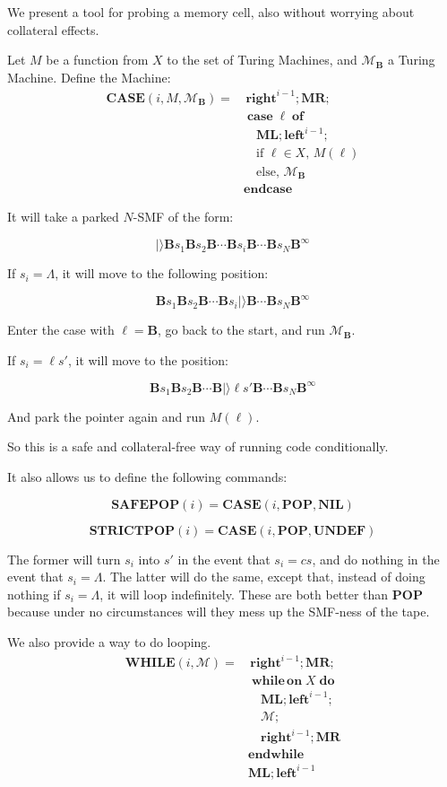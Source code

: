 \documentclass{article}
\newcommand{\B}{\mathbf{B}}
\newcommand{\M}{\mathcal{M}}
\DeclareMathOperator{\Nwhileon}{\mathbf{while\,on}}
\DeclareMathOperator{\Ndo}{\mathbf{do}}
\DeclareMathOperator{\Nendwhile}{\mathbf{endwhile}}
\DeclareMathOperator{\Ncase}{\mathbf{case}}
\DeclareMathOperator{\Nof}{\mathbf{of}}
\DeclareMathOperator{\Nendcase}{\mathbf{endcase}}
\newcommand{\NIL}{\mathbf{NIL}}
\newcommand{\MR}{\mathbf{MR}}
\newcommand{\ML}{\mathbf{ML}}
\newcommand{\UNDEF}{\mathbf{UNDEF}}
\newcommand{\Oright}{\mathbf{right}}
\newcommand{\Oleft}{\mathbf{left}}
\newcommand{\POP}{\mathbf{POP}}
\newcommand{\SAFEPOP}{\mathbf{SAFEPOP}}
\newcommand{\STRICTPOP}{\mathbf{STRICTPOP}}
\newcommand{\CASE}{\mathbf{CASE}}
\newcommand{\WHILE}{\mathbf{WHILE}}
\begin{document}
	We present a tool for probing a memory cell, also without worrying about collateral effects.
	
	Let $M$ be a function from $X$ to the set of Turing Machines, and $\M_\B$ a Turing Machine. Define the Machine:
	\begin{align*}
	\CASE(i, M, \M_\B) =& \,\Oright^{i-1}; \MR;\\
	&\Ncase \ell \Nof\\
	&\quad \ML; \Oleft^{i-1};\\
	&\quad \text{if $\ell \in X$, } M(\ell)\\
	&\quad \text{else, } \M_\B\\
	&\Nendcase
	\end{align*}
	
	It will take a parked $N$-SMF of the form:
	
	\[|\rangle \B s_1 \B s_2 \B \cdots \B s_i \B \cdots \B s_N \B^\infty\]
	
	If $s_i = \Lambda$, it will move to the following position:
	
	\[\B s_1 \B s_2 \B \cdots \B s_i |\rangle \B \cdots \B s_N \B^\infty\]
	
	Enter the case with $\ell = \B$, go back to the start, and run $\M_\B$.
	
	If $s_i = \ell s'$, it will move to the position:
	
	\[\B s_1 \B s_2 \B \cdots \B |\rangle \ell s' \B \cdots \B s_N \B^\infty\]
	
	And park the pointer again and run $M(\ell)$.
	
	So this is a safe and collateral-free way of running code conditionally.
	
	It also allows us to define the following commands:
	
	\[\SAFEPOP(i) = \CASE(i, \POP, \NIL)\]
	
	\[\STRICTPOP(i) = \CASE(i, \POP, \UNDEF)\]
	
	The former will turn $s_i$ into $s'$ in the event that $s_i = c s$, and do nothing in the event that $s_i = \Lambda$. The latter will do the same, except that, instead of doing nothing if $s_i = \Lambda$, it will loop indefinitely. These are both better than $\POP$ because under no circumstances will they mess up the SMF-ness of the tape.
	
	We also provide a way to do looping.
	\begin{align*}
	\WHILE(i, \M) =& \,\Oright^{i-1}; \MR;\\
	&\Nwhileon X \Ndo\\
	&\quad \ML; \Oleft^{i-1};\\
	&\quad \M;\\
	&\quad \Oright^{i-1}; \MR\\
	&\Nendwhile\\
	&\ML; \Oleft^{i-1}
	\end{align*}
	
\end{document}
